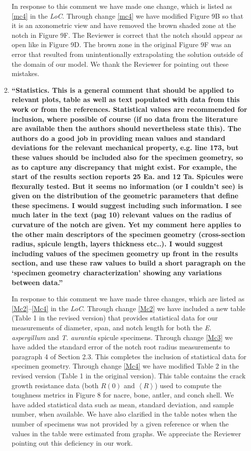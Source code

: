 \documentclass[11pt,letterpaper]{report}
\begin{document}
\begin{enumerate}[label=\textit{2.\arabic*},wide, labelwidth=!, labelindent=0pt]
In response to this comment we have made one change, which is listed as \ref{mc4} in the \textit{LoC}.
%
Through change \ref{mc4} we have modified Figure 9B so that it is an axonometric view and have removed the brown shaded zone at the notch in Figure 9F. The Reviewer is correct that the notch should appear as open like in Figure 9D. The brown zone in the original Figure 9F was an error that resulted from unintentionally extrapolating the solution outside of the domain of our model. We thank the Reviewer for pointing out these mistakes.


\item \label{r2c7} {\bf ``Statistics. This is a general comment that should be applied to relevant plots, table as well as text populated with data from this work or from the references. Statistical values are recommended for inclusion, where possible of course (if no data from the literature are available then the authors should nevertheless state this). The authors do a good job in providing mean values and standard deviations for the relevant mechanical property, e.g. line 173, but these values should be included also for the specimen geometry, so as to capture any discrepancy that might exist. For example, the start of the results section reports 25 Ea. and 12 Ta. Spicules were flexurally tested. But it seems no information (or I couldn't see) is given on the distribution of the geometric parameters that define these specimens. I would suggest including such information. I see much later in the text (pag 10) relevant values on the radius of curvature of the notch are given. Yet my comment here applies to the other main descriptors of the specimen geometry (cross-section radius, spicule length, layers thickness etc..). I would suggest including values of the specimen geometry up front in the results section, and use these raw values to build a short paragraph on the `specimen geometry characterization' showing any variations between data.''}

In response to this comment we have made three changes, which are listed as \ref{Mc2}--\ref{Mc4} in the \textit{LoC}.
%
Through change \ref{Mc2} we have included a new table (Table 1 in the revised version) that provides statistical data for our measurements of diameter, span, and notch length for both the \textit{E. aspergillum} and \textit{T. aurantia} spicule specimens.
%
Through change \ref{Mc3} we have added the standard error of the notch root radius measurements to paragraph 4 of Section 2.3. This completes the inclusion of statistical data for specimen geometry.
%
Through change \ref{Mc4} we have modified Table 2 in the revised version (Table 1 in the original version). This table contains the crack growth resistance data (both $R(0)$ and $\left< R\right>$) used to compute the toughness metrics in Figure 8 for nacre, bone, antler, and conch shell. We have added statistical data such as mean, standard deviation, and sample number, when available. We have also clarified in the table notes when the number of specimens was not provided by a given reference or when the values in the table were estimated from graphs. We appreciate the Reviewer pointing out this deficiency in our work.


\end{enumerate}
\end{document}
